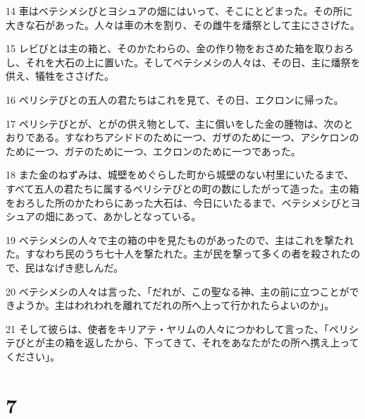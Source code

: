 \par 14 車はベテシメシびとヨシュアの畑にはいって、そこにとどまった。その所に大きな石があった。人々は車の木を割り、その雌牛を燔祭として主にささげた。
\par 15 レビびとは主の箱と、そのかたわらの、金の作り物をおさめた箱を取りおろし、それを大石の上に置いた。そしてベテシメシの人々は、その日、主に燔祭を供え、犠牲をささげた。
\par 16 ペリシテびとの五人の君たちはこれを見て、その日、エクロンに帰った。
\par 17 ペリシテびとが、とがの供え物として、主に償いをした金の腫物は、次のとおりである。すなわちアシドドのために一つ、ガザのために一つ、アシケロンのために一つ、ガテのために一つ、エクロンのために一つであった。
\par 18 また金のねずみは、城壁をめぐらした町から城壁のない村里にいたるまで、すべて五人の君たちに属するペリシテびとの町の数にしたがって造った。主の箱をおろした所のかたわらにあった大石は、今日にいたるまで、ベテシメシびとヨシュアの畑にあって、あかしとなっている。
\par 19 ベテシメシの人々で主の箱の中を見たものがあったので、主はこれを撃たれた。すなわち民のうち七十人を撃たれた。主が民を撃って多くの者を殺されたので、民はなげき悲しんだ。
\par 20 ベテシメシの人々は言った、「だれが、この聖なる神、主の前に立つことができようか。主はわれわれを離れてだれの所へ上って行かれたらよいのか」。
\par 21 そして彼らは、使者をキリアテ・ヤリムの人々につかわして言った、「ペリシテびとが主の箱を返したから、下ってきて、それをあなたがたの所へ携え上ってください」。

\chapter{7}

